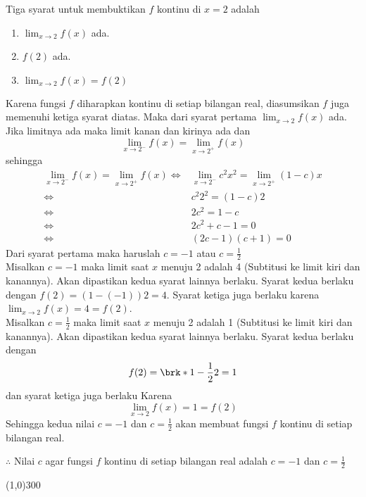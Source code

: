 \begin{enumerate}[leftmargin=*, label={\arabic*}.]
\begin{enumerate}[label={\alph*}.]
Tiga syarat untuk membuktikan $f$ kontinu di $x=2$ adalah
\begin{enumerate}[label={\arabic*}.]
    \item $\lim_{x\to 2} f(x)$ ada.
    \item $f(2)$ ada.
    \item $\lim_{x\to 2} f(x) = f(2)$
\end{enumerate}
Karena fungsi $f$ diharapkan kontinu di setiap bilangan real, diasumsikan $f$ 
juga memenuhi ketiga syarat diatas. Maka dari syarat pertama $\lim_{x\to 2} f(x)$ 
ada. Jika limitnya ada maka limit kanan dan kirinya ada dan 
\[
\lim_{x\to 2^{-}} f(x) = \lim_{x\to 2^{+}} f(x)
\]
sehingga
\begin{align*}
    \lim_{x\to 2^{-}} f(x) = \lim_{x\to 2^{+}} f(x)
    \iff &\lim_{x\to 2^{-}} c^{2}x^{2} = \lim_{x\to 2^{+}} (1-c)x\\
    \iff &c^{2}2^{2} = (1-c)2\\
    \iff &2c^{2} = 1-c\\
    \iff &2c^{2}+c-1 = 0\\
    \iff &(2c-1)(c+1) = 0
\end{align*}
Dari syarat pertama maka haruslah $c=-1$ atau $c=\frac{1}{2}$\\
Misalkan $c=-1$ maka limit saat $x$ menuju 2 adalah 4 (Subtitusi ke limit kiri dan 
kanannya). Akan dipastikan kedua syarat lainnya berlaku. Syarat kedua berlaku 
dengan $f(2) = (1-(-1))2 = 4$. Syarat ketiga juga berlaku karena 
$\lim_{x\to 2} f(x) = 4 = f(2)$.\\
Misalkan $c=\frac{1}{2}$ maka limit saat $x$ menuju 2 adalah 1 (Subtitusi ke limit 
kiri dan kanannya). Akan dipastikan kedua syarat lainnya berlaku. Syarat kedua berlaku 
dengan
\[
    f(2) = \brk*{1-\frac{1}{2}}2 = 1
\] 
dan syarat ketiga juga berlaku Karena
\[
    \lim_{x\to 2} f(x) = 1 = f(2)
\] 
Sehingga kedua nilai $c=-1$ dan $c=\frac{1}{2}$ akan membuat fungsi $f$ 
kontinu di setiap bilangan real.

$\therefore$ Nilai $c$ agar fungsi $f$ kontinu di setiap bilangan real adalah $c=-1$ 
dan $c=\frac{1}{2}$
\begin{center}
    \line(1,0){300}
\end{center}
\end{enumerate}
\end{enumerate}
